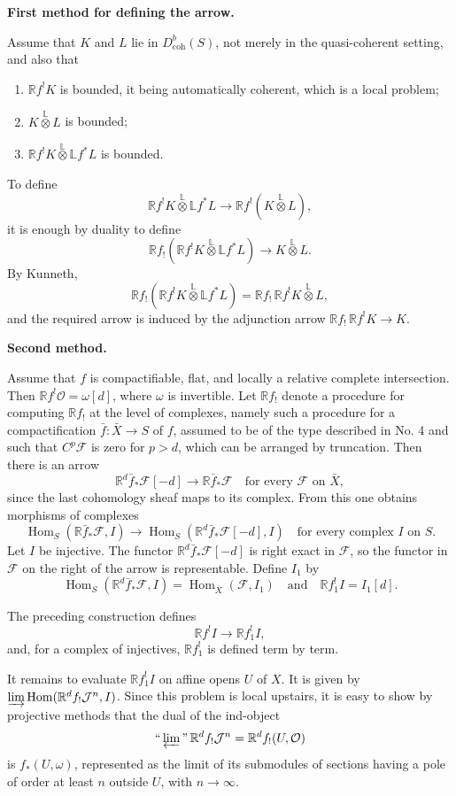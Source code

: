 \documentclass[12pt]{amsart}
\theoremstyle{plain}
\theoremstyle{definition}
\DeclareMathOperator{\Hom}{Hom}
\newcommand{\coh}{\text{coh}}
\newcommand{\cF}{\mathcal{F}}
\newcommand{\cJ}{\mathcal{J}}
\newcommand{\cO}{\mathcal{O}}
\newcommand{\cDb}{D^{b}}
\newcommand{\bR}{\mathbb{R}}
\newcommand{\bL}{\mathbb{L}}
\begin{document}
\textbf{First method for defining the arrow.}

Assume that $K$ and $L$ lie in $\cDb_{\coh}(S)$, not merely in the quasi-coherent setting, and also that
\begin{enumerate}
\item[(a)] $\bR f^!K$ is bounded, it being automatically coherent, which is a local problem;
\item[(b)] $K\overset{\mathbb L}{\otimes}L$ is bounded;
\item[(c)] $\bR f^!K\overset{\mathbb L}{\otimes}\bL f^*L$ is bounded.
\end{enumerate}

To define
\[
\bR f^!K\overset{\mathbb L}{\otimes}\bL f^*L\to\bR f^!(K\overset{\mathbb L}{\otimes}L),
\]
it is enough by duality to define
\[
\bR f_!(\bR f^!K\overset{\mathbb L}{\otimes}\bL f^*L)\to K\overset{\mathbb L}{\otimes}L.
\]
By Kunneth,
\[
\bR f_!(\bR f^!K\overset{\mathbb L}{\otimes}\bL f^*L)=\bR f_!\,\bR f^!K\overset{\mathbb L}{\otimes}L,
\]
and the required arrow is induced by the adjunction arrow $\bR f_!\,\bR f^!K\to K$.

\textbf{Second method.}

Assume that $f$ is compactifiable, flat, and locally a relative complete intersection. Then $\bR f^!\cO=\omega[d]$, where $\omega$ is invertible. Let $\bR f_!$ denote a procedure for computing $\bR f_!$ at the level of complexes, namely such a procedure for a compactification $\bar f:\bar X\to S$ of $f$, assumed to be of the type described in No. 4 and such that $C^p\cF$ is zero for $p>d$, which can be arranged by truncation. Then there is an arrow
\[
\bR^d\bar f_*\cF[-d]\to\bR\bar f_*\cF\quad\text{for every }\cF\text{ on }\bar X,
\]
since the last cohomology sheaf maps to its complex. From this one obtains morphisms of complexes
\[
\Hom_S(\bR\bar f_*\cF,I)\to\Hom_S(\bR^d\bar f_*\cF[-d],I)
\quad\text{for every complex }I\text{ on }S.
\]
Let $I$ be injective. The functor $\bR^d\bar f_*\cF[-d]$ is right exact in $\cF$, so the functor in $\cF$ on the right of the arrow is representable. Define $I_1$ by
\[
\Hom_S(\bR^d\bar f_*\cF,I)=\Hom_{\bar X}(\cF,I_1)\quad\text{and}\quad \bR f^!_1I=I_1[d].
\]

The preceding construction defines
\[
\bR f^!I\to\bR f^!_1I,
\]
and, for a complex of injectives, $\bR f^!_1$ is defined term by term.

It remains to evaluate $\bR f^!_1I$ on affine opens $U$ of $X$. It is given by $\varinjlim\Hom(\bR^df_!\cJ^n,I)$. Since this problem is local upstairs, it is easy to show by projective methods that the dual of the ind-object
\[
\text{``}\varprojlim\text{''}\,\bR^df_!\cJ^n=\bR^df_!(U,\cO)
\]
is $f_*(U,\omega)$, represented as the limit of its submodules of sections having a pole of order at least $n$ outside $U$, with $n\to\infty$.
\end{document}
